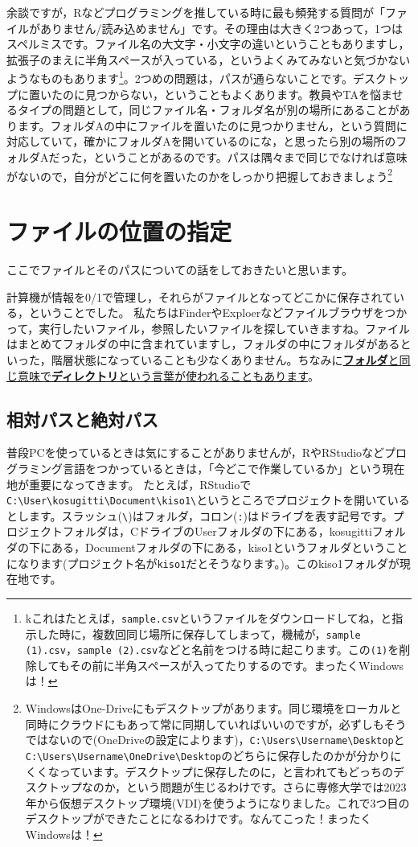 \documentclass{ltjsbook}
\begin{document}
余談ですが，Rなどプログラミングを推している時に最も頻発する質問が「ファイルがありません/読み込めません」です。その理由は大きく2つあって，1つはスペルミスです。ファイル名の大文字・小文字の違いということもありますし，拡張子のまえに半角スペースが入っている，というよくみてみないと気づかないようなものもあります\footnote{kこれはたとえば，\verb|sample.csv|というファイルをダウンロードしてね，と指示した時に，複数回同じ場所に保存してしまって，機械が，\verb|sample (1).csv|，\verb|sample (2).csv|などと名前をつける時に起こります。この\verb|(1)|を削除してもその前に半角スペースが入ってたりするのです。まったくWindowsは！}。2つめの問題は，パスが通らないことです。デスクトップに置いたのに見つからない，ということもよくあります。教員やTAを悩ませるタイプの問題として，同じファイル名・フォルダ名が別の場所にあることがあります。フォルダAの中にファイルを置いたのに見つかりません，という質問に対応していて，確かにフォルダAを開いているのにな，と思ったら別の場所のフォルダAだった，ということがあるのです。パスは隅々まで同じでなければ意味がないので，自分がどこに何を置いたのかをしっかり把握しておきましょう\footnote{WindowsはOne-Driveにもデスクトップがあります。同じ環境をローカルと同時にクラウドにもあって常に同期していればいいのですが，必ずしもそうではないので(OneDriveの設定によります)，\verb|C:\Users\Username\Desktop|と\verb|C:\Users\Username\OneDrive\Desktop|のどちらに保存したのかが分かりにくくなっています。デスクトップに保存したのに，と言われてもどっちのデスクトップなのか，という問題が生じるわけです。さらに専修大学では2023年から仮想デスクトップ環境(VDI)を使うようになりました。これで3つ目のデスクトップができたことになるわけです。なんてこった！まったくWindowsは！}

\section{ファイルの位置の指定}
\label{setLocation}
ここでファイルとそのパスについての話をしておきたいと思います。

計算機が情報を0/1で管理し，それらがファイルとなってどこかに保存されている，ということでした。
私たちはFinderやExploerなどファイルブラウザをつかって，実行したいファイル，参照したいファイルを探していきますね。ファイルはまとめてフォルダの中に含まれていますし，フォルダの中にフォルダがあるといった，階層状態になっていることも少なくありません。ちなみに\underline{\textbf{フォルダ}と同じ意味で\textbf{ディレクトリ}という言葉が使われることもあります}。

\subsection{相対パスと絶対パス}
普段PCを使っているときは気にすることがありませんが，RやRStudioなどプログラミング言語をつかっているときは，「今どこで作業しているか」という現在地が重要になってきます。
たとえば，RStudioで\verb|C:\User\kosugitti\Document\kiso1\|というところでプロジェクトを開いているとします。スラッシュ(\verb|\|)はフォルダ，コロン(\verb|:|)はドライブを表す記号です。プロジェクトフォルダは，CドライブのUserフォルダの下にある，kosugittiフォルダの下にある，Documentフォルダの下にある，kiso1というフォルダということになります(プロジェクト名が\texttt{kiso1}だとそうなります。)。このkiso1フォルダが現在地です。
\end{document}
